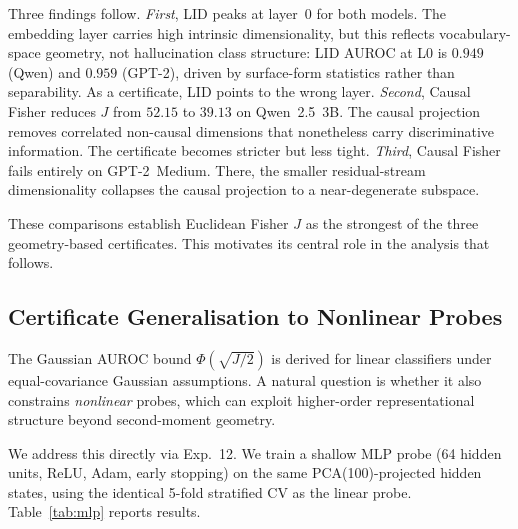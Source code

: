 \documentclass[onecolumn]{jmlr}
\begin{document}
Three findings follow.
\textit{First}, LID peaks at layer~0 for both models. The embedding
layer carries high intrinsic dimensionality, but this reflects
vocabulary-space geometry, not hallucination class structure: LID AUROC
at L0 is $0.949$ (Qwen) and $0.959$ (GPT-2), driven by surface-form
statistics rather than separability. As a certificate, LID points to the
wrong layer.
\textit{Second}, Causal Fisher reduces $J$ from $52.15$ to $39.13$ on
Qwen~2.5~3B. The causal projection removes correlated non-causal
dimensions that nonetheless carry discriminative information. The
certificate becomes stricter but less tight.
\textit{Third}, Causal Fisher fails entirely on GPT-2~Medium. There, the
smaller residual-stream dimensionality collapses the causal projection
to a near-degenerate subspace.

These comparisons establish Euclidean Fisher $J$ as the strongest of
the three geometry-based certificates. This motivates its central role
in the analysis that follows.

\subsection{Certificate Generalisation to Nonlinear Probes}
\label{sec:mlp-probe}

The Gaussian AUROC bound $\Phi(\sqrt{J/2})$ is derived for linear
classifiers under equal-covariance Gaussian assumptions. A natural
question is whether it also constrains \emph{nonlinear} probes, which
can exploit higher-order representational structure beyond
second-moment geometry.

We address this directly via Exp.~12. We train a shallow MLP probe (64
hidden units, ReLU, Adam, early stopping) on the same PCA(100)-projected
hidden states, using the identical 5-fold stratified CV as the linear
probe. Table~\ref{tab:mlp} reports results.
\end{document}
